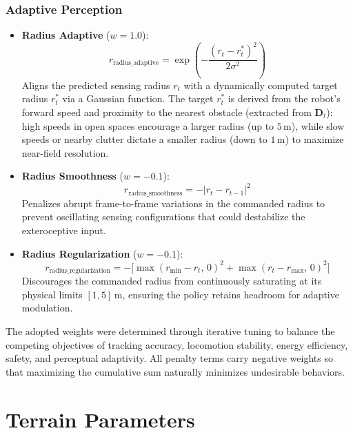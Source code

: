 \subsubsection*{Adaptive Perception}
\begin{itemize}
    \item \textbf{Radius Adaptive} ($w = 1.0$):
    \begin{equation}
        r_{\text{radius\_adaptive}} = \exp\!\left(-\frac{(r_t - r_t^*)^2}{2\sigma^2}\right)
    \end{equation}
    Aligns the predicted sensing radius $r_t$ with a dynamically computed target radius $r_t^*$ via a Gaussian function. The target $r_t^*$ is derived from the robot's forward speed and proximity to the nearest obstacle (extracted from $\mathbf{D}_t$): high speeds in open spaces encourage a larger radius (up to $5$\,m), while slow speeds or nearby clutter dictate a smaller radius (down to $1$\,m) to maximize near-field resolution.
    \item \textbf{Radius Smoothness} ($w = -0.1$):
    \begin{equation}
        r_{\text{radius\_smoothness}} = -|r_t - r_{t-1}|^2
    \end{equation}
    Penalizes abrupt frame-to-frame variations in the commanded radius to prevent oscillating sensing configurations that could destabilize the exteroceptive input.
    \item \textbf{Radius Regularization} ($w = -0.1$):
    \begin{equation}
        r_{\text{radius\_regularization}} = -\big[\max(r_{\text{min}} - r_t,\,0)^2 + \max(r_t - r_{\text{max}},\,0)^2\big]
    \end{equation}
    Discourages the commanded radius from continuously saturating at its physical limits $[1, 5]$\,m, ensuring the policy retains headroom for adaptive modulation.
\end{itemize}

The adopted weights were determined through iterative tuning to balance the competing objectives of tracking accuracy, locomotion stability, energy efficiency, safety, and perceptual adaptivity. All penalty terms carry negative weights so that maximizing the cumulative sum naturally minimizes undesirable behaviors.

\section{Terrain Parameters}

